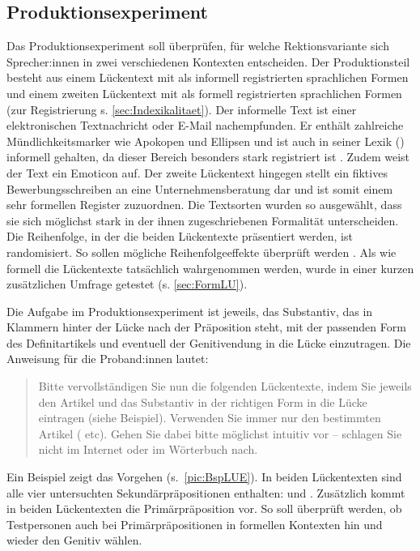 \subsection{Produktionsexperiment} 
\label{sec:LU}
Das Produktionsexperiment soll überprüfen, für welche Rektionsvariante sich Sprecher:innen in zwei verschiedenen Kontexten entscheiden. 
Der Produktionsteil besteht aus einem Lückentext mit als informell registrierten sprachlichen Formen und einem zweiten Lückentext mit als formell registrierten sprachlichen Formen (zur Registrierung s. \autoref{sec:Indexikalitaet}). 
Der informelle Text ist einer elektronischen Textnachricht oder E-Mail nachempfunden. 
Er enthält zahlreiche Mündlichkeitsmarker wie Apokopen und Ellipsen und ist auch in seiner Lexik () informell gehalten, da dieser Bereich besonders stark registriert ist \citep[s.][88]{Halliday1964}. 
Zudem weist der Text ein Emoticon auf. 
Der zweite Lückentext hingegen stellt ein fiktives Bewerbungsschreiben an eine Unternehmensberatung dar und ist somit einem sehr formellen Register zuzuordnen. 
Die Textsorten wurden so ausgewählt, dass sie sich möglichst stark in der ihnen zugeschriebenen Formalität unterscheiden.  
Die Reihenfolge, in der die beiden Lückentexte präsentiert werden, ist randomisiert. So sollen mögliche Reihenfolgeeffekte überprüft werden \citep[s.][37--38]{Porst2014}. 
Als wie formell die Lückentexte tatsächlich wahrgenommen werden, wurde in einer kurzen zusätzlichen Umfrage getestet (s. \autoref{sec:FormLU}).

\begin{sloppypar}
Die Aufgabe %
im Produktionsexperiment ist jeweils, das Substantiv, das in Klammern hinter der Lücke nach der Prä\-po\-si\-tion steht, mit der passenden Form des Definitartikels und eventuell der Geni\-tiv\-end\-ung in die Lücke einzutragen. Die Anweisung für die Proband:innen lautet: 
\end{sloppypar}

\begin{quote}\glqq Bitte vervollständigen Sie nun die folgenden Lückentexte, indem Sie jeweils den Artikel und das Substantiv in der richtigen Form in die Lücke eintragen (siehe Beispiel). Verwenden Sie immer nur den bestimmten Artikel ( etc). Gehen Sie dabei bitte möglichst intuitiv vor -- schlagen Sie nicht im Internet oder im Wörterbuch nach.\grqq{}\end{quote}

Ein Beispiel zeigt das Vorgehen (s.~\autoref{pic:BspLUE}). In beiden Lückentexten sind alle vier untersuchten Sekundärpräpositionen enthalten:  und . Zusätzlich kommt in beiden Lückentexten die Primärpräposition  vor. So soll überprüft werden, ob Testpersonen auch bei Primärpräpositionen in formellen Kontexten hin und wieder den Genitiv wählen.

